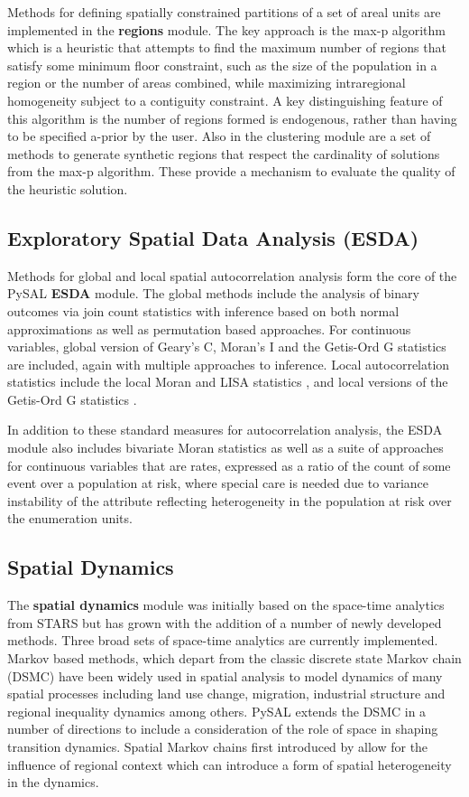 \documentclass[11pt, titlepage]{amsart}
\begin{document}
Methods for defining spatially constrained partitions of a set of areal units are implemented in
the \textbf{regions} module. The key approach is the max-p algorithm \citep{duque2012max}  which is
a heuristic that attempts to find the maximum number of regions that
satisfy some minimum floor constraint, such as the size of the
population in a region or the number of areas combined, while maximizing
intraregional homogeneity subject to a contiguity constraint. A key
distinguishing feature of this algorithm is the  number of regions
formed is endogenous, rather than having to be specified a-prior by the
user. Also in the clustering module are a set of methods to generate
synthetic regions that respect the cardinality of solutions from the
max-p algorithm. These provide a mechanism to evaluate the quality of
the heuristic solution.

\subsection{Exploratory Spatial Data Analysis (ESDA)}

Methods for global and local spatial autocorrelation analysis form the
core of the PySAL \textbf{ESDA} module. The global methods include the analysis
of binary outcomes via join count statistics with inference based on
both normal approximations as well as permutation based approaches. For
continuous variables, global version of Geary's C, Moran's I and the
Getis-Ord G statistics are included, again with multiple approaches to
inference. Local autocorrelation statistics include the local Moran and
LISA statistics \citep{Anselin:1995rt}, and local versions of the Getis-Ord G statistics
\citep{Getis:1992oi}.

In addition to these standard measures for autocorrelation analysis,
the ESDA module also includes bivariate Moran statistics as well as a
suite of approaches for continuous variables that are rates, expressed
as a ratio of the count of some event over a population at risk, where
special care is needed due to variance instability of the attribute
reflecting heterogeneity in the population at risk over the enumeration
units.

\subsection{Spatial Dynamics}

The \textbf{spatial dynamics} module was initially based on the space-time
analytics from STARS \citep{Rey:2006uh} but has grown with the addition of a number of
newly developed methods. Three broad sets of space-time analytics are
currently implemented. Markov based methods, which
depart from the classic discrete state Markov chain (DSMC) have
been widely used in spatial analysis to model dynamics of many spatial
processes including land use change, migration, industrial structure and
regional inequality dynamics among others. PySAL extends the DSMC in a
number of directions to include a consideration of the role of space in
shaping transition dynamics. Spatial Markov chains first introduced by
\cite{Rey:2001of} allow for the influence of regional context which can
introduce a form of spatial heterogeneity in the dynamics.
\end{document}
